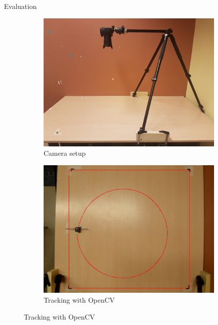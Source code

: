 \documentclass{beamer}
\begin{document}
\begin{frame}{Evaluation}
	\vspace{1em}
	\begin{figure}
		\centering
		\begin{subfigure}[b]{0.45\textwidth}
			\includegraphics[width=\textwidth]{pics/movement_setup.jpg}
			\caption*{Camera setup}
		\end{subfigure}
		\quad
		\begin{subfigure}[b]{0.45\textwidth}
			\includegraphics[width=\textwidth]{pics/movement_example.png}
			\caption*{Tracking with OpenCV}
		\end{subfigure}
	\end{figure}
\end{frame}
\end{document}
